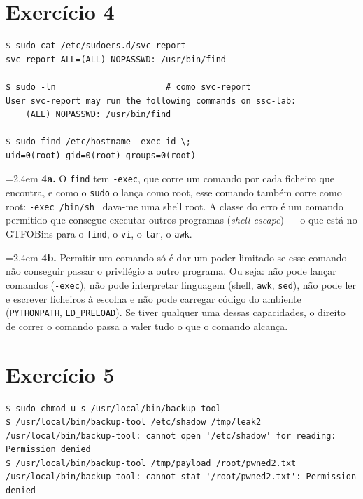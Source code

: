 \documentclass[a4paper,11pt]{article}
\newenvironment{answer}[1]{%
  \par\addvspace{7pt}\noindent
  \hangindent=2.4em\hangafter=1
  {\color{sscnblue}\bfseries #1\hspace{0.55em}}\ignorespaces}
  {\par\addvspace{5pt}}
\newcommand{\cmd}[1]{\textcolor{sscnblue}{\texttt{#1}}}
\begin{document}
\section{Exerc\'icio 4}

\begin{lstlisting}
$ sudo cat /etc/sudoers.d/svc-report
svc-report ALL=(ALL) NOPASSWD: /usr/bin/find

$ sudo -ln                      # como svc-report
User svc-report may run the following commands on ssc-lab:
    (ALL) NOPASSWD: /usr/bin/find

$ sudo find /etc/hostname -exec id \;
uid=0(root) gid=0(root) groups=0(root)
\end{lstlisting}

\begin{answer}{4a.}
O \cmd{find} tem \cmd{-exec}, que corre um comando por cada ficheiro que encontra, e como
o \cmd{sudo} o lan\c{c}a como root, esse comando tamb\'em corre como root:
\cmd{-exec /bin/sh \;} dava-me uma shell root. A classe do erro \'e um comando permitido
que consegue executar outros programas (\emph{shell escape}) --- o que est\'a no GTFOBins
para o \cmd{find}, o \cmd{vi}, o \cmd{tar}, o \cmd{awk}.
\end{answer}

\begin{answer}{4b.}
Permitir um comando s\'o \'e dar um poder limitado se esse comando n\~ao conseguir passar
o privil\'egio a outro programa. Ou seja: n\~ao pode lan\c{c}ar comandos (\cmd{-exec}),
n\~ao pode interpretar linguagem (shell, \cmd{awk}, \cmd{sed}), n\~ao pode ler e escrever
ficheiros \`a escolha e n\~ao pode carregar c\'odigo do ambiente (\cmd{PYTHONPATH},
\cmd{LD\_PRELOAD}). Se tiver qualquer uma dessas capacidades, o direito de correr o
comando passa a valer tudo o que o comando alcan\c{c}a.
\end{answer}

\section{Exerc\'icio 5}

\begin{lstlisting}
$ sudo chmod u-s /usr/local/bin/backup-tool
$ /usr/local/bin/backup-tool /etc/shadow /tmp/leak2
/usr/local/bin/backup-tool: cannot open '/etc/shadow' for reading:
Permission denied
$ /usr/local/bin/backup-tool /tmp/payload /root/pwned2.txt
/usr/local/bin/backup-tool: cannot stat '/root/pwned2.txt': Permission denied
\end{lstlisting}
\end{document}
